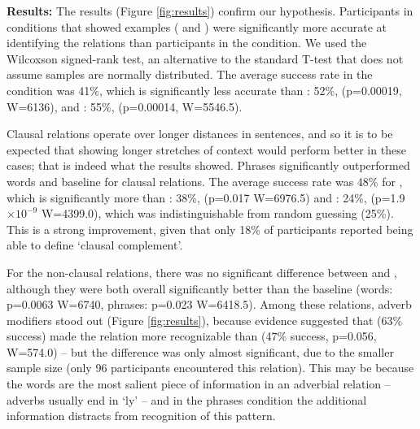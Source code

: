 {\bf Results:} The results (Figure \ref{fig:results}) confirm our hypothesis. Participants in conditions that showed examples ( and ) were significantly more accurate at identifying the relations than participants in the  condition. We used the Wilcoxson signed-rank test, an alternative to the standard T-test that does not assume samples are normally distributed. The average success rate in the  condition was 41\%, which is significantly less accurate than : 52\%, (p=0.00019, W=6136), and : 55\%, (p=0.00014, W=5546.5).

Clausal relations operate over longer distances in sentences, and so it is to be expected that showing longer stretches of context would perform better in these cases; that is indeed what the results showed.
Phrases significantly outperformed words and baseline for clausal relations. The average success rate was 48\% for , which is significantly more than : 38\%, (p=0.017 W=6976.5) and : 24\%, (p=1.9$\times 10^{-9}$ W=4399.0), which was indistinguishable from random guessing (25\%). This is a  strong improvement, given that only 18\% of participants reported being able to define  `clausal complement'.

For the non-clausal relations, there was no significant difference between  and , although they were both overall significantly better than the baseline (words: p=0.0063 W=6740, phrases: p=0.023 W=6418.5). Among these relations, adverb modifiers stood out (Figure \ref{fig:results}), because evidence suggested that  (63\% success) made the relation more recognizable than  (47\% success, p=0.056, W=574.0) -- but the difference was only almost significant, due to the smaller sample size (only 96 participants encountered this relation). This may be because the words are the most salient piece of information in an adverbial relation -- adverbs usually end in `ly' -- and in the phrases condition the additional information distracts from recognition of this pattern.
